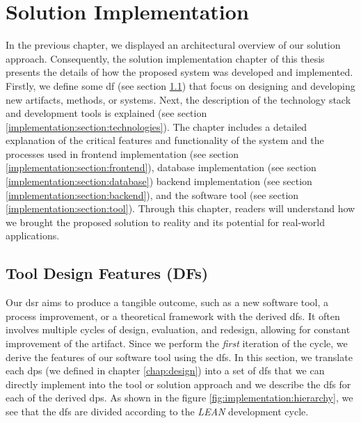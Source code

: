 
\chapter{Solution Implementation}

\ifpdf
    \graphicspath{{Chapters/Implementation/Figs/}{Chapters/Implementation/Figs/}{Chapters/Implementation/Figs/}}
\else
    \graphicspath{{Chapters/Implementation/Figs/}{Chapters/Implementation/Figs/}}
\fi
In the previous chapter, we displayed an architectural overview of our solution approach.
Consequently, the solution implementation chapter of this thesis presents the details of how the proposed system was developed and implemented.
Firstly, we define some \ac{df} (see section \ref{implementation:section:designfeatures}) that focus on designing and developing new artifacts, methods, or systems.
Next, the description of the technology stack and development tools is explained (see section \ref{implementation:section:technologies}).
The chapter includes a detailed explanation of the critical features and functionality of the system and the processes used in frontend implementation (see section \ref{implementation:section:frontend}), database implementation (see section \ref{implementation:section:database}) backend implementation (see section \ref{implementation:section:backend}), and the software tool (see section \ref{implementation:section:tool}).
Through this chapter, readers will understand how we brought the proposed solution to reality and its potential for real-world applications.

\section{Tool Design Features (DFs)}
\label{implementation:section:designfeatures}
Our \ac{dsr} aims to produce a tangible outcome, such as a new software tool, a process improvement, or a theoretical framework with the derived \ac{df}s.
It often involves multiple cycles of design, evaluation, and redesign, allowing for constant improvement of the artifact.
Since we perform the \textit{first} iteration of the cycle, we derive the features of our software tool using the \ac{df}s.
In this section, we translate each \ac{dp}s (we defined in chapter \ref{chap:design}) into a set of \ac{df}s that we can directly implement into the tool or solution approach and we describe the \ac{df}s for each of the derived \ac{dp}s.
As shown in the figure \ref{fig:implementation:hierarchy}, we see that the \ac{df}s are divided according to the \textit{LEAN} development cycle.
\clearpage

